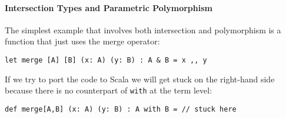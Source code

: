 {%




\paragraph{Intersection Types and Parametric Polymorphism}


The simplest example that involves both intersection and polymorphism is a
function that just uses the merge operator:
\begin{lstlisting}
let merge [A] [B] (x: A) (y: B) : A & B = x ,, y
\end{lstlisting}
If we try to port the code to Scala we will get stuck on the right-hand side
because there is no counterpart of \lstinline{with} at the term level:
\begin{lstlisting}
def merge[A,B] (x: A) (y: B) : A with B = // stuck here
\end{lstlisting}

}
